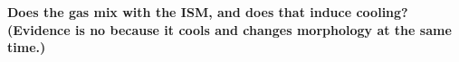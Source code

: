 \documentclass[fleqn,usenatbib]{mnras}
\newcommand{\Mdot}{\dot{M}}
\newcommand{\nH}{n_{\rm H}}
\begin{document}
\textbf{
Does the gas mix with the ISM, and does that induce cooling? (Evidence is no because it cools and changes morphology at the same time.)
}

\end{document}
